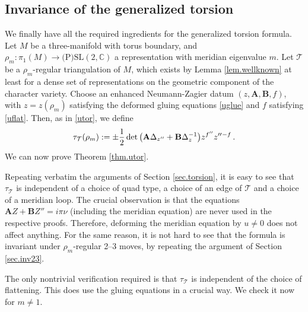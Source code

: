 \documentclass[12pt]{amsart}
\newcommand{\lbl}{\label}
\renewcommand{\eta}{\nu}
\theoremstyle{definition}
\newtheorem{definition}[theorem]{Definition}
\def\BZ{\mathbb Z}
\def\be{  \begin{equation} }
\def\ee{  \end{equation} }
\newcommand{\CT}{\mathcal{T}}
\newcommand{\C}{\mathbb{C}}
\newcommand{\mb}{\mathbf}
\numberwithin{equation}{section}
\begin{document}
%
%



\subsection{Invariance of the generalized torsion}
\label{sec.utorsion}

We finally have all the required ingredients for the generalized torsion 
formula. Let $M$ be a three-manifold with torus boundary, and 
$\rho_m:\pi_1(M)\to \text{(P)SL}(2,\C)$ a representation with meridian 
eigenvalue $m$. Let $\CT$ be a $\rho_m$-regular triangulation of $M$, 
which exists by Lemma \ref{lem.wellknown} at least for a dense set of 
representations on the geometric component of the character variety. 
Choose an enhanced Neumann-Zagier datum $(z,\mb A,\mb B,f)$, with
$z=z(\rho_m)$ satisfying the deformed gluing equations \eqref{uglue} and 
$f$ satisfying \eqref{uflat}. Then, as in \eqref{utor}, we define
%
\be 
\notag
\tau_\CT(\rho_m) := \pm\frac12\det\big(\mb A\Delta_{z''}
+\mb B\Delta_z^{-1}\big)z^{f''}z''{}^{-f}  \,.
\ee
%
We can now prove Theorem \ref{thm.utor}.



Repeating verbatim the arguments of Section \ref{sec.torsion}, it is easy
to see that $\tau_{\CT}$ is independent of a choice of quad type, a choice of an
edge of $\CT$ and a choice of a meridian loop. The crucial 
observation is that the equations $\mb AZ+\mb B Z''=i\pi \eta$ (including the meridian equation) are never 
used in the respective proofs. Therefore, deforming the meridian equation by $u\neq 0$ does not affect anything. For the same reason, 
it is not hard to see that the formula is invariant under $\rho_m$-regular 
2--3 moves, by repeating the argument of Section \ref{sec.inv23}.

The only nontrivial verification required is that $\tau_{\CT}$ is independent of the choice of flattening. This does use the gluing equations in a 
crucial way.  We check it now for $m\neq 1$.
\end{document}
